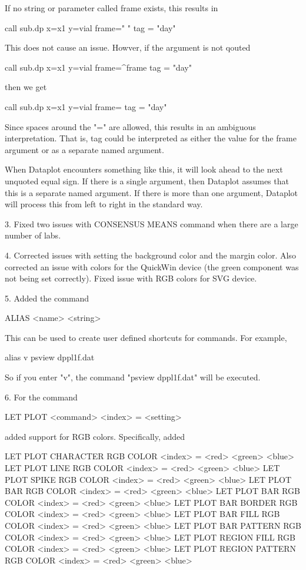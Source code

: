         If no string or parameter called frame exists, this results in

            call sub.dp   x=x1  y=vial  frame=" " tag = "day"

        This does not cause an issue.  Howver, if the argument is not
        qouted

            call sub.dp   x=x1  y=vial  frame=^frame tag = "day"

        then we get

            call sub.dp   x=x1  y=vial  frame=  tag = "day"

        Since spaces around the "=" are allowed, this results in an
        ambiguous interpretation.  That is, tag could be interpreted
        as either the value for the frame argument or as a separate
        named argument.

        When Dataplot encounters something like this, it will look
        ahead to the next unquoted equal sign.  If there is a single
        argument, then Dataplot assumes that this is a separate named
        argument.  If there is more than one argument, Dataplot will
        process this from left to right in the standard way.

 3. Fixed two issues with CONSENSUS MEANS command when there are a large
    number of labs.

 4. Corrected issues with setting the background color and the margin
    color.  Also corrected an issue with colors for the QuickWin device
    (the green component was not being set correctly).  Fixed issue with
    RGB colors for SVG device.

 5. Added the command

        ALIAS  <name>  <string>

    This can be used to create user defined shortcuts for commands.
    For example,

        alias v  psview dppl1f.dat

    So if you enter "v", the command "psview dppl1f.dat" will be
    executed.

 6. For the command

        LET PLOT <command> <index> = <setting>

    added support for RGB colors.  Specifically, added

        LET PLOT CHARACTER       RGB COLOR <index> = <red> <green> <blue>
        LET PLOT LINE            RGB COLOR <index> = <red> <green> <blue>
        LET PLOT SPIKE           RGB COLOR <index> = <red> <green> <blue>
        LET PLOT BAR             RGB COLOR <index> = <red> <green> <blue>
        LET PLOT BAR             RGB COLOR <index> = <red> <green> <blue>
        LET PLOT BAR BORDER      RGB COLOR <index> = <red> <green> <blue>
        LET PLOT BAR FILL        RGB COLOR <index> = <red> <green> <blue>
        LET PLOT BAR PATTERN     RGB COLOR <index> = <red> <green> <blue>
        LET PLOT REGION FILL     RGB COLOR <index> = <red> <green> <blue>
        LET PLOT REGION PATTERN  RGB COLOR <index> = <red> <green> <blue>

